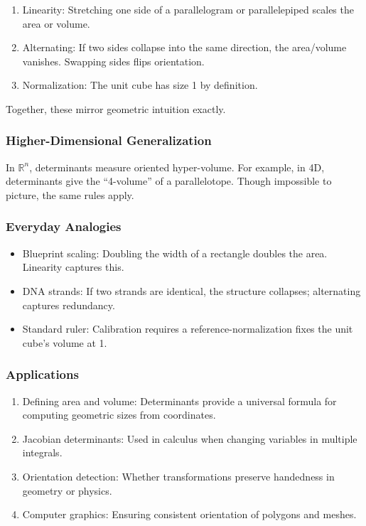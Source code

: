\documentclass[
  letterpaper,
  DIV=11,
  numbers=noendperiod]{scrreprt}
\providecommand{\tightlist}{%
  \setlength{\itemsep}{0pt}\setlength{\parskip}{0pt}}
\begin{document}
\begin{enumerate}
\def\labelenumi{\arabic{enumi}.}
\tightlist
\item
  Linearity: Stretching one side of a parallelogram or parallelepiped
  scales the area or volume.
\item
  Alternating: If two sides collapse into the same direction, the
  area/volume vanishes. Swapping sides flips orientation.
\item
  Normalization: The unit cube has size 1 by definition.
\end{enumerate}

Together, these mirror geometric intuition exactly.

\subsubsection{Higher-Dimensional
Generalization}\label{higher-dimensional-generalization}

In \(\mathbb{R}^n\), determinants measure oriented hyper-volume. For
example, in 4D, determinants give the ``4-volume'' of a parallelotope.
Though impossible to picture, the same rules apply.

\subsubsection{Everyday Analogies}\label{everyday-analogies-48}

\begin{itemize}
\tightlist
\item
  Blueprint scaling: Doubling the width of a rectangle doubles the area.
  Linearity captures this.
\item
  DNA strands: If two strands are identical, the structure collapses;
  alternating captures redundancy.
\item
  Standard ruler: Calibration requires a reference-normalization fixes
  the unit cube's volume at 1.
\end{itemize}

\subsubsection{Applications}\label{applications-14}

\begin{enumerate}
\def\labelenumi{\arabic{enumi}.}
\tightlist
\item
  Defining area and volume: Determinants provide a universal formula for
  computing geometric sizes from coordinates.
\item
  Jacobian determinants: Used in calculus when changing variables in
  multiple integrals.
\item
  Orientation detection: Whether transformations preserve handedness in
  geometry or physics.
\item
  Computer graphics: Ensuring consistent orientation of polygons and
  meshes.
\end{enumerate}
\end{document}
